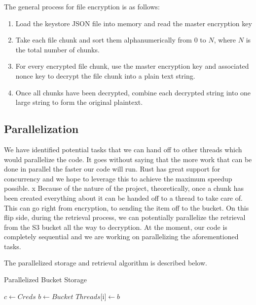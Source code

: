 \documentclass[conference]{IEEEtran}
\begin{document}
\medskip
\indent The general process for file encryption is as follows:
\begin{enumerate}
	\item Load the keystore JSON file into memory and read the master encryption key
	\item
		Take each file chunk and sort them alphanumerically from 0 to $N$, where
		$N$ is the total number of chunks.
	\item
		For every encrypted file chunk, use the master encryption key and associated
		nonce key to decrypt the file chunk into a plain text string.
	\item
		Once all chunks have been decrypted, combine each decrypted string into one
		large string to form the original plaintext.
\end{enumerate}

\subsection{Parallelization}

We have identified potential tasks that we can hand off to other threads which would parallelize the code.
It goes without saying that the more work that can be done in parallel the faster our code will run.
Rust has great support for concurrency and we hope to leverage this to achieve the maximum speedup possible.
x
Because of the nature of the project, theoretically, once a chunk has been created everything about it can be handed off to a thread to take care of.
This can go right from encryption, to sending the item off to the bucket.
On this flip side, during the retrieval process, we can potentially parallelize the retrieval from the S3 bucket all the way to decryption.
At the moment, our code is completely sequential and we are working on parallelizing the aforementioned tasks.

The parallelized storage and retrieval algorithm is described below.

\begin{algorithm}
	\caption{Parallelized Bucket Storage}\label{storage}
	\begin{algpsuedocode}
	\State $c\gets Creds$
	\State $b\gets Bucket$
	\Else
	\State $Threads[$i$] \gets b$
	\EndElse
	\EndProcedure
	\end{algpsuedocode}
\end{algorithm}
\end{document}
